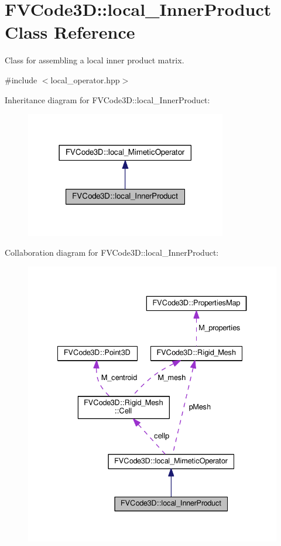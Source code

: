 \hypertarget{classFVCode3D_1_1local__InnerProduct}{}\section{F\+V\+Code3D\+:\+:local\+\_\+\+Inner\+Product Class Reference}
\label{classFVCode3D_1_1local__InnerProduct}


Class for assembling a local inner product matrix.  




{\ttfamily \#include $<$local\+\_\+operator.\+hpp$>$}



Inheritance diagram for F\+V\+Code3D\+:\+:local\+\_\+\+Inner\+Product\+:
\nopagebreak
\begin{figure}[H]
\begin{center}
\leavevmode
\includegraphics[width=249pt]{classFVCode3D_1_1local__InnerProduct__inherit__graph}
\end{center}
\end{figure}


Collaboration diagram for F\+V\+Code3D\+:\+:local\+\_\+\+Inner\+Product\+:
\nopagebreak
\begin{figure}[H]
\begin{center}
\leavevmode
\includegraphics[width=334pt]{classFVCode3D_1_1local__InnerProduct__coll__graph}
\end{center}
\end{figure}
